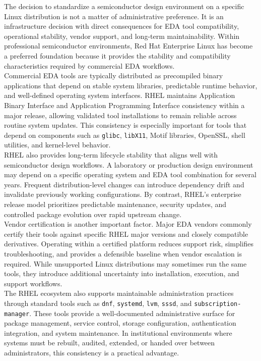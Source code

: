 The decision to standardize a semiconductor design environment on a specific Linux distribution is not a matter of administrative preference. It is an infrastructure decision with direct consequences for EDA tool compatibility, operational stability, vendor support, and long-term maintainability. Within professional semiconductor environments, Red Hat Enterprise Linux has become a preferred foundation because it provides the stability and compatibility characteristics required by commercial EDA workflows.\\

\noindent Commercial EDA tools are typically distributed as precompiled binary applications that depend on stable system libraries, predictable runtime behavior, and well-defined operating system interfaces. RHEL maintains Application Binary Interface and Application Programming Interface consistency within a major release, allowing validated tool installations to remain reliable across routine system updates. This consistency is especially important for tools that depend on components such as \texttt{glibc}, \texttt{libX11}, Motif libraries, OpenSSL, shell utilities, and kernel-level behavior.\\

\noindent RHEL also provides long-term lifecycle stability that aligns well with semiconductor design workflows. A laboratory or production design environment may depend on a specific operating system and EDA tool combination for several years. Frequent distribution-level changes can introduce dependency drift and invalidate previously working configurations. By contrast, RHEL's enterprise release model prioritizes predictable maintenance, security updates, and controlled package evolution over rapid upstream change.\\

\noindent Vendor certification is another important factor. Major EDA vendors commonly certify their tools against specific RHEL major versions and closely compatible derivatives. Operating within a certified platform reduces support risk, simplifies troubleshooting, and provides a defensible baseline when vendor escalation is required. While unsupported Linux distributions may sometimes run the same tools, they introduce additional uncertainty into installation, execution, and support workflows.\\

\noindent The RHEL ecosystem also supports maintainable administration practices through standard tools such as \texttt{dnf}, \texttt{systemd}, \texttt{lvm}, \texttt{sssd}, and \texttt{subscription-manager}. These tools provide a well-documented administrative surface for package management, service control, storage configuration, authentication integration, and system maintenance. In institutional environments where systems must be rebuilt, audited, extended, or handed over between administrators, this consistency is a practical advantage.\\

